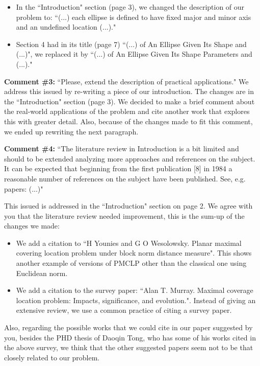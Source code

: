 \begin{letter}{}
\begin{itemize}
			\item In the ``Introduction" section (page 3), we changed the description of our problem to: ``(...) each ellipse is defined to have fixed major and minor axis and an undefined location (...)."
			
			\item Section 4 had in its title (page 7) ``(...) of An Ellipse Given Its Shape and (...)", we replaced it by ``(...) of An Ellipse Given Its Shape Parameters and (...)."
		\end{itemize}
		
		\textbf{Comment \#3:} ``Please, extend the description of practical applications."
		We address this issued by re-writing a piece of our introduction. The changes are in the ``Introduction" section (page 3). We decided to make a brief comment about the real-world applications of the problem and cite another work that explores this with greater detail. Also, because of the changes made to fit this comment, we ended up rewriting the next paragraph.
		
		\textbf{Comment \#4:} ``The literature review in Introduction is a bit limited and should to be extended analyzing more approaches and references on the subject. It can be expected that beginning from the first publication [8] in 1984 a reasonable number of references on the subject have been published. See, e.g. papers: (...)"
		
		This issued is addressed in the ``Introduction" section on page 2. We agree with you that the literature review needed improvement, this is the sum-up of the changes we made:

		\begin{itemize}
			\item We add a citation to ``H Younies and G O Wesolowsky. Planar maximal covering location problem under block norm distance measure". This shows another example of versions of PMCLP other than the classical one using Euclidean norm.
			\item We add a citation to the survey paper: ``Alan T. Murray. Maximal coverage location problem: Impacts, significance, and evolution.". Instead of giving an extensive review, we use a common practice of citing a survey paper. 
		\end{itemize}
	
		Also, regarding the possible works that we could cite in our paper suggested by you, besides the PHD thesis of Daoqin Tong, who has some of his works cited in the above survey, we think that the other suggested papers seem not to be that closely related to our problem.
		

\end{letter}
